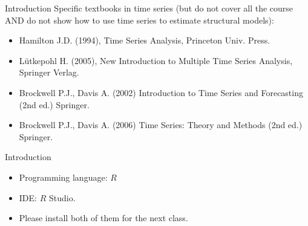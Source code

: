 \documentclass{beamer}
\begin{document}




\begin{frame}{Introduction}
    Specific textbooks in time series (but do not cover all the course AND do not show how to use time series to estimate structural models):
    
\begin{itemize}
\item Hamilton J.D. (1994), Time Series Analysis, Princeton Univ. Press.
\item Lütkepohl H. (2005), New Introduction to Multiple Time Series Analysis, Springer Verlag.
\item  Brockwell P.J., Davis A. (2002) Introduction to Time Series and Forecasting (2nd ed.) Springer.
\item  Brockwell P.J., Davis A. (2006) Time Series: Theory and Methods (2nd ed.) Springer.
\end{itemize}
\end{frame}


\begin{frame}{Introduction}
    \begin{itemize}
        \item Programming language: $R$
        \item IDE: $R$ Studio.
        \item Please install both of them for the next class.
\end{itemize}
\end{frame}
\end{document}
